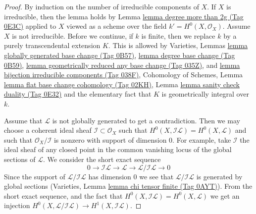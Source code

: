 \documentclass{amsart}
\theoremstyle{plain}
\theoremstyle{definition}
\theoremstyle{remark}
\numberwithin{equation}{subsection}
\begin{document}
\begin{proof}
By induction on the number of irreducible components of $X$.
If $X$ is irreducible, then the lemma holds by
Lemma \href{https://stacks.math.columbia.edu/tag/0E3C}{lemma degree more than 2g (Tag 0E3C)}
applied to $X$ viewed as a scheme over the field
$k' = H^0(X, \mathcal{O}_X)$. Assume $X$ is not irreducible.
Before we continue, if $k$ is finite, then we replace $k$
by a purely transcendental extension $K$. This is allowed by
Varieties, Lemmas
\href{https://stacks.math.columbia.edu/tag/0B57}{lemma globally generated base change (Tag 0B57)},
\href{https://stacks.math.columbia.edu/tag/0B59}{lemma degree base change (Tag 0B59)},
\href{https://stacks.math.columbia.edu/tag/035Z}{lemma geometrically reduced any base change (Tag 035Z)}, and
\href{https://stacks.math.columbia.edu/tag/038F}{lemma bijection irreducible components (Tag 038F)},
Cohomology of Schemes, Lemma \href{https://stacks.math.columbia.edu/tag/02KH}{lemma flat base change cohomology (Tag 02KH)},
Lemma \href{https://stacks.math.columbia.edu/tag/0E32}{lemma sanity check duality (Tag 0E32)} and the elementary fact that
$K$ is geometrically integral over $k$.

\medskip\noindent
Assume that $\mathcal{L}$ is not globally generated to get a contradiction.
Then we may choose a coherent ideal sheaf
$\mathcal{I} \subset \mathcal{O}_X$ such that
$H^0(X, \mathcal{I}\mathcal{L}) = H^0(X, \mathcal{L})$
and such that $\mathcal{O}_X/\mathcal{I}$ is nonzero with
support of dimension $0$. For example, take $\mathcal{I}$
the ideal sheaf of any closed point in the common
vanishing locus of the global sections of $\mathcal{L}$.
We consider the short exact sequence
$$
0 \to \mathcal{I}\mathcal{L} \to \mathcal{L} \to 
\mathcal{L}/\mathcal{I}\mathcal{L} \to 0
$$
Since the support of $\mathcal{L}/\mathcal{I}\mathcal{L}$
has dimension $0$ we see that $\mathcal{L}/\mathcal{I}\mathcal{L}$
is generated by global sections
(Varieties, Lemma \href{https://stacks.math.columbia.edu/tag/0AYT}{lemma chi tensor finite (Tag 0AYT)}).
From the short exact sequence,
and the fact that $H^0(X, \mathcal{I}\mathcal{L}) = H^0(X, \mathcal{L})$
we get an injection
$H^0(X, \mathcal{L}/\mathcal{I}\mathcal{L}) \to H^1(X, \mathcal{I}\mathcal{L})$.


\end{proof}
\end{document}
